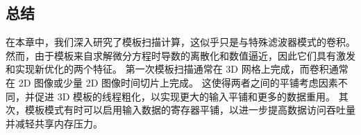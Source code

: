 \subsection{总结}
在本章中，我们深入研究了模板扫描计算，这似乎只是与特殊滤波器模式的卷积。 
然而，由于模板来自求解微分方程时导数的离散化和数值逼近，因此它们具有激发和实现新优化的两个特征。 
第一次模板扫描通常在 3D 网格上完成，而卷积通常在 2D 图像或少量 2D 图像时间切片上完成。 
这使得两者之间的平铺考虑因素不同，并促进 3D 模板的线程粗化，以实现更大的输入平铺和更多的数据重用。 
其次，模板模式有时可以启用输入数据的寄存器平铺，以进一步提高数据访问吞吐量并减轻共享内存压力。